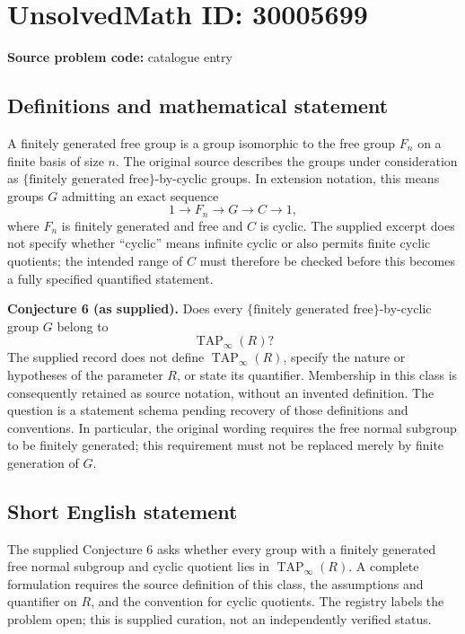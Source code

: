 \documentclass[11pt]{article}
\begin{document}
\section*{UnsolvedMath ID: 30005699}
\textbf{Source problem code:} catalogue entry
\subsection{Definitions and mathematical statement}
A finitely generated free group is a group isomorphic to the free group \(F_n\) on a finite basis of size \(n\). The original source describes the groups under consideration as \(\{\text{finitely generated free}\}\)-by-cyclic groups. In extension notation, this means groups \(G\) admitting an exact sequence
\[
1\longrightarrow F_n\longrightarrow G\longrightarrow C\longrightarrow 1,
\]
where \(F_n\) is finitely generated and free and \(C\) is cyclic. The supplied excerpt does not specify whether ``cyclic'' means infinite cyclic or also permits finite cyclic quotients; the intended range of \(C\) must therefore be checked before this becomes a fully specified quantified statement.

\textbf{Conjecture 6 (as supplied).} Does every \(\{\text{finitely generated free}\}\)-by-cyclic group \(G\) belong to
\[
\operatorname{TAP}_{\infty}(R)?
\]
The supplied record does not define \(\operatorname{TAP}_{\infty}(R)\), specify the nature or hypotheses of the parameter \(R\), or state its quantifier. Membership in this class is consequently retained as source notation, without an invented definition. The question is a statement schema pending recovery of those definitions and conventions. In particular, the original wording requires the free normal subgroup to be finitely generated; this requirement must not be replaced merely by finite generation of \(G\).
\subsection{Short English statement}
The supplied Conjecture 6 asks whether every group with a finitely generated free normal subgroup and cyclic quotient lies in \(\operatorname{TAP}_{\infty}(R)\). A complete formulation requires the source definition of this class, the assumptions and quantifier on \(R\), and the convention for cyclic quotients. The registry labels the problem open; this is supplied curation, not an independently verified status.
\end{document}
